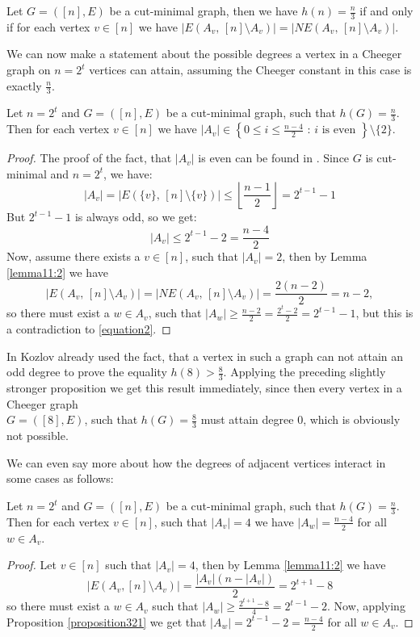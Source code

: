\begin{lem}\label{lemma11:2}
Let \(G=([n],E)\) be a cut-minimal graph, then we have \(h(n)=\frac{n}{3}\) if and only if for each vertex \(v\in [n]\) we have \(|E(A_v\text{, }[n]\setminus A_v)|=|NE(A_v\text{, }[n]\setminus A_v)|\).
\end{lem}

We can now make a statement about the possible degrees a vertex in a Cheeger graph on \(n=2^t\) vertices can attain, assuming the Cheeger constant in this case is exactly \(\frac{n}{3}\).

\begin{prop}\label{proposition321}
Let \(n=2^t\) and \(G=([n],E)\) be a cut-minimal graph, such that \(h(G)=\frac{n}{3}\). Then for each vertex \(v\in [n]\) we have \(|A_v|\in\left\{0\leq i\leq\frac{n-4}{2}\text{ : }i\text{ is even }\right\}\setminus\{2\}\).
\begin{proof}
The proof of the fact, that \(|A_v|\) is even can be found in \cite{1}. Since \(G\) is cut-minimal and \(n=2^t\), we have:
\[
|A_v|=|E(\{v\}\text{, }[n]\setminus\{v\})|\leq\left\lfloor\frac{n-1}{2}\right\rfloor=2^{t-1}-1
\]
But \(2^{t-1}-1\) is always odd, so we get:
\begin{equation}\label{equation2}
|A_v|\leq 2^{t-1}-2=\frac{n-4}{2}
\end{equation}
Now, assume there exists a \(v\in [n]\), such that \(|A_v|=2\), then by Lemma \ref{lemma11:2} we have
\[
|E(A_v\text{, }[n]\setminus A_v)|=|NE(A_v\text{, }[n]\setminus A_v)|=\frac{2(n-2)}{2}=n-2,
\]
so there must exist a \(w\in A_v\), such that \(|A_w|\geq\frac{n-2}{2}=\frac{2^t-2}{2}=2^{t-1}-1\), but this is a contradiction to \ref{equation2}.
\end{proof}
\end{prop}

\begin{expl}
In \cite{1} Kozlov already used the fact, that a vertex in such a graph can not attain an odd degree to prove the equality \(h(8)>\frac{8}{3}\). Applying the preceding slightly stronger proposition we get this result immediately, since then every vertex in a Cheeger graph\\
\(G=([8],E)\), such that \(h(G)=\frac{8}{3}\) must attain degree \(0\), which is obviously not possible.
\end{expl}

We can even say more about how the degrees of adjacent vertices interact in some cases as follows:

\begin{lem}
Let \(n=2^t\) and \(G=([n],E)\) be a cut-minimal graph, such that \(h(G)=\frac{n}{3}\). Then for each vertex \(v\in [n]\), such that \(|A_v|=4\) we have \(|A_w|=\frac{n-4}{2}\) for all \(w\in A_v\).
\begin{proof}
Let \(v\in [n]\) such that \(|A_v|=4\), then by Lemma \ref{lemma11:2} we have
\[
|E(A_v,[n]\setminus A_v)|=\frac{|A_v|(n-|A_v|)}{2}=2^{t+1}-8
\]
so there must exist a \(w\in A_v\) such that \(|A_w|\geq\frac{2^{t+1}-8}{4}=2^{t-1}-2\). Now, applying Proposition \ref{proposition321} we get that \(|A_w|=2^{t-1}-2=\frac{n-4}{2}\) for all \(w\in A_v\).

\end{proof}
\end{lem}